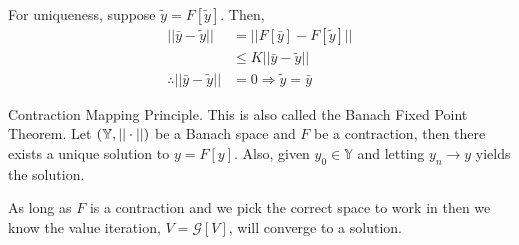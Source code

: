 For uniqueness, suppose $\tilde{y}=F[\tilde{y}]$.
Then,
\begin{align*}
||\bar{y}-\tilde{y}|| &= ||F[\bar{y}]-F[\tilde{y}]|| \\
&\leq K||\bar{y}-\tilde{y}|| \\
\therefore ||\bar{y}-\tilde{y}|| &= 0 \Rightarrow \tilde{y} = \bar{y}
\end{align*}

\begin{theorem}{Contraction Mapping Principle.}
\label{th:bfp}
This is also called the Banach Fixed Point Theorem.
Let $(\mathbb{Y},||\cdot||)$ be a Banach space and $F$ be a contraction, then there exists a unique solution to $y=F[y]$.
Also, given $y_0\in\mathbb{Y}$ and letting $y_n\to y$ yields the solution.
\end{theorem}

As long as $F$ is a contraction and we pick the correct space to work in then we know the value iteration, $V=\mathcal{G}[V]$, will converge to a solution.
